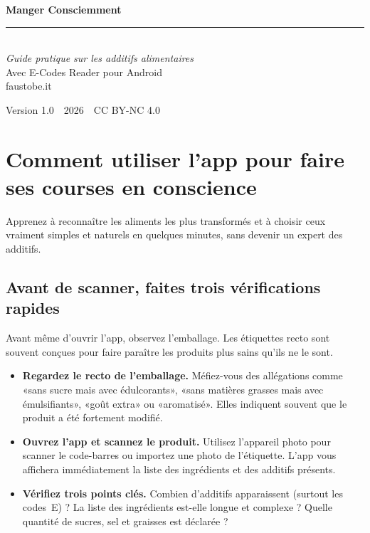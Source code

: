 \documentclass[a5paper,12pt,oneside,openany]{book}
\begin{document}
\begin{titlepage}
\pagecolor{verdescuro}
\color{white}
\vspace*{2.5cm}
\begin{center}
  {\fontsize{36}{42}\selectfont\bfseries Manger Consciemment}\\[1.2cm]
  \textcolor{verdecharo}{\rule{6cm}{0.6pt}}\\[1.2cm]
  {\large\itshape Guide pratique sur les additifs alimentaires}\\[0.6cm]
  {\normalsize Avec E-Codes Reader pour Android}\\[3cm]
  {\normalsize\textcolor{verdecharo}{faustobe.it}}
\end{center}
\vfill
\begin{center}
  {\small Version 1.0\ \textbullet\ 2026\ \textbullet\ CC BY-NC 4.0}
\end{center}
\end{titlepage}
\nopagecolor

\frontmatter
\tableofcontents
\mainmatter

\chapter{Comment utiliser l'app pour faire ses courses en conscience}

Apprenez à reconnaître les aliments les plus transformés et à choisir ceux
vraiment simples et naturels en quelques minutes, sans devenir un expert
des additifs.

\section{Avant de scanner, faites trois vérifications rapides}

Avant même d'ouvrir l'app, observez l'emballage. Les étiquettes recto sont
souvent conçues pour faire paraître les produits plus sains qu'ils ne le sont.

\begin{itemize}
  \item \textbf{Regardez le recto de l'emballage.} Méfiez-vous des allégations
    comme «sans sucre mais avec édulcorants», «sans matières grasses mais avec
    émulsifiants», «goût extra» ou «aromatisé». Elles indiquent souvent que le
    produit a été fortement modifié.
  \item \textbf{Ouvrez l'app et scannez le produit.} Utilisez l'appareil photo
    pour scanner le code-barres ou importez une photo de l'étiquette. L'app vous
    affichera immédiatement la liste des ingrédients et des additifs présents.
  \item \textbf{Vérifiez trois points clés.} Combien d'additifs apparaissent
    (surtout les codes~E) ? La liste des ingrédients est-elle longue et
    complexe ? Quelle quantité de sucres, sel et graisses est déclarée ?
\end{itemize}
\end{document}
